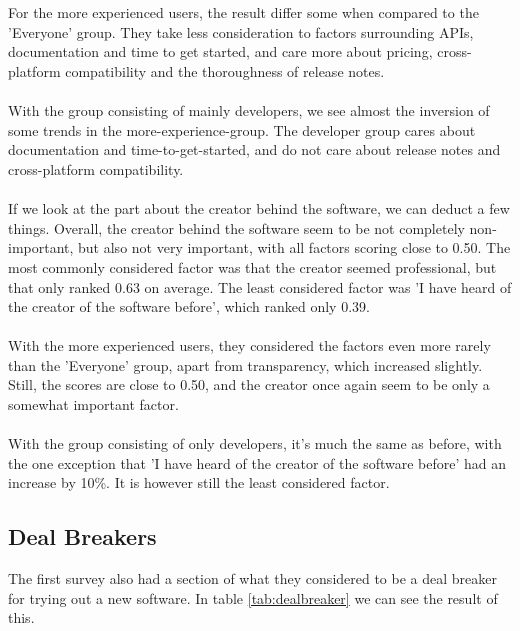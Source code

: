 \documentclass{cslthse-msc}
\begin{document}
    \\ \\
    For the more experienced users, the result differ some when compared to the 'Everyone' group. They take less consideration to factors surrounding APIs, documentation and time to get started, and care more about pricing,
    cross-platform compatibility and the thoroughness of release notes.
    \\ \\
    With the group consisting of mainly developers, we see almost the
    inversion of some trends in the more-experience-group. The developer
    group cares about documentation and time-to-get-started, and do not care
    about release notes and cross-platform compatibility.
    \\ \\
    If we look at the part about the creator behind the software, we can deduct a few things.
    Overall, the creator behind the software seem to be not completely non-important,
    but also not very important, with all factors scoring close to 0.50. The most
    commonly considered factor was that the creator seemed professional, but
    that only ranked 0.63 on average. The least considered factor was 'I have heard of
    the creator of the software before', which ranked only 0.39.
    \\ \\
    With the more experienced users, they considered the factors even more
    rarely than the 'Everyone' group, apart from transparency, which increased
    slightly. Still, the scores are close to 0.50, and the creator once again
    seem to be only a somewhat important factor.
    \\ \\
    With the group consisting of only developers, it's much the same as
    before, with the one exception that 'I have heard of the creator of the
    software before' had an increase by 10\%. It is however still the least
    considered factor.
    \subsection{Deal Breakers}
    The first survey also had a section of what they considered to be a deal breaker for trying out a new software.
    In table \ref{tab:dealbreaker} we can see the result of this.
\end{document}
